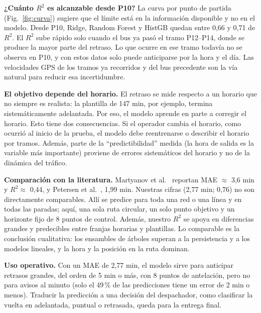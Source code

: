 \documentclass[conference,spanish]{IEEEtran}
\begin{document}
\textbf{¿Cuánto $R^2$ es alcanzable desde P10?} La curva por punto de partida (Fig.~\ref{fig:curva}) sugiere que el límite está en la información disponible y no en el modelo. Desde P10, Ridge, Random Forest y HistGB quedan entre 0,66 y 0,71 de $R^2$. El $R^2$ sube rápido solo cuando el bus ya pasó el tramo P12--P14, donde se produce la mayor parte del retraso. Lo que ocurre en ese tramo todavía no se observa en P10, y con estos datos solo puede anticiparse por la hora y el día. Las velocidades GPS de los tramos ya recorridos y del bus precedente son la vía natural para reducir esa incertidumbre.

\textbf{El objetivo depende del horario.} El retraso se mide respecto a un horario que no siempre es realista: la plantilla de 147 min, por ejemplo, termina sistemáticamente adelantada. Por eso, el modelo aprende en parte a corregir el horario. Esto tiene dos consecuencias. Si el operador cambia el horario, como ocurrió al inicio de la prueba, el modelo debe reentrenarse o describir el horario por tramos. Además, parte de la ``predictibilidad'' medida (la hora de salida es la variable más importante) proviene de errores sistemáticos del horario y no de la dinámica del tráfico.

\textbf{Comparación con la literatura.} Martyanov et al.~\cite{martyanov2026} reportan MAE $\approx$ 3,6 min y $R^2\approx$ 0,44, y Petersen et al.~\cite{petersen2019}, 1,99 min. Nuestras cifras (2,77 min; 0,76) no son directamente comparables. Allí se predice para toda una red o una línea y en todas las paradas; aquí, una sola ruta circular, un solo punto objetivo y un horizonte fijo de 8 puntos de control. Además, nuestro $R^2$ se apoya en diferencias grandes y predecibles entre franjas horarias y plantillas. Lo comparable es la conclusión cualitativa: los ensambles de árboles superan a la persistencia y a los modelos lineales, y la hora y la posición en la ruta dominan.

\textbf{Uso operativo.} Con un MAE de 2,77 min, el modelo sirve para anticipar retrasos grandes, del orden de 5 min o más, con 8 puntos de antelación, pero no para avisos al minuto (solo el 49\,\% de las predicciones tiene un error de 2 min o menos). Traducir la predicción a una decisión del despachador, como clasificar la vuelta en adelantada, puntual o retrasada, queda para la entrega final.
\end{document}
